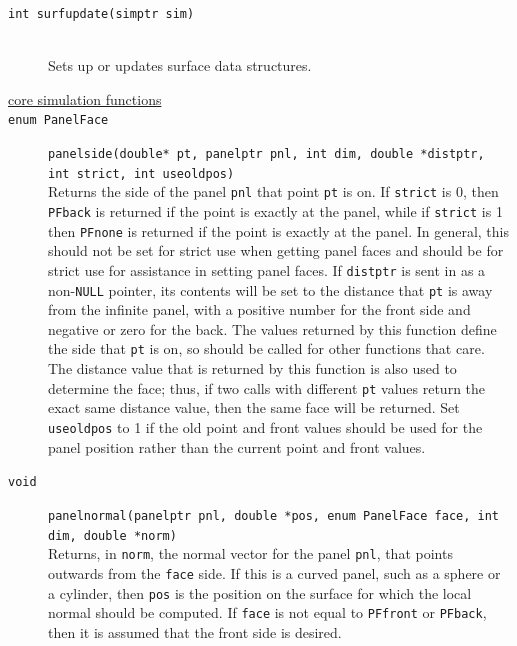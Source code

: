 \documentclass {scrbook}
\newcommand {\ttt} {\texttt}
\begin{document}
\begin{description}
\item[\ttt{int surfupdate(simptr sim)}]
\hfill \\
Sets up or updates surface data structures.

\item[\underline{core simulation functions}]

\item[\ttt{enum PanelFace}]
\ttt{panelside(double* pt, panelptr pnl, int dim, double *distptr, int strict, int useoldpos)}
\hfill \\
Returns the side of the panel \ttt{pnl} that point \ttt{pt} is on. If \ttt{strict} is 0, then \ttt{PFback} is returned if the point is exactly at the panel, while if \ttt{strict} is 1 then \ttt{PFnone} is returned if the point is exactly at the panel. In general, this should not be set for strict use when getting panel faces and should be for strict use for assistance in setting panel faces. If \ttt{distptr} is sent in as a non-\ttt{NULL} pointer, its contents will be set to the distance that \ttt{pt} is away from the infinite panel, with a positive number for the front side and negative or zero for the back. The values returned by this function define the side that \ttt{pt} is on, so should be called for other functions that care. The distance value that is returned by this function is also used to determine the face; thus, if two calls with different \ttt{pt} values return the exact same distance value, then the same face will be returned. Set \ttt{useoldpos} to 1 if the old point and front values should be used for the panel position rather than the current point and front values.

\item[\ttt{void}]
\ttt{panelnormal(panelptr pnl, double *pos, enum PanelFace face, int dim, double *norm)}
\hfill \\
Returns, in \ttt{norm}, the normal vector for the panel \ttt{pnl}, that points outwards from the \ttt{face} side. If this is a curved panel, such as a sphere or a cylinder, then \ttt{pos} is the position on the surface for which the local normal should be computed. If \ttt{face} is not equal to \ttt{PFfront} or \ttt{PFback}, then it is assumed that the front side is desired.


\end{description}
\end{document}
